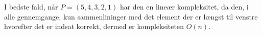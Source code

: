 I bedste fald, når $P= (5,4,3,2,1)$ har den en lineær kompleksitet, da den, i alle gennemgange, kun sammenlininger med det element der er længst til venstre hvorefter det er indsat korrekt, dermed er kompleksiteten $O(n)$.






